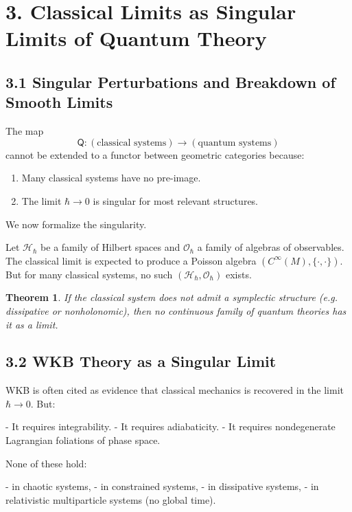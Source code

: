 \documentclass[12pt,oneside]{book}
\theoremstyle{plain}
\newtheorem{theorem}{Theorem}[chapter]
\theoremstyle{definition}
\begin{document}
\bigskip

\section{3. Classical Limits as Singular Limits of Quantum Theory}

\subsection{3.1 Singular Perturbations and Breakdown of Smooth Limits}

The map  
\[
\mathsf{Q}: (\text{classical systems}) \to (\text{quantum systems})
\]
cannot be extended to a functor between geometric categories because:

\begin{enumerate}
\item Many classical systems have no pre-image.  
\item The limit $\hbar \to 0$ is singular for most relevant structures.
\end{enumerate}

We now formalize the singularity.

Let $\mathcal{H}_\hbar$ be a family of Hilbert spaces and $\mathcal{O}_\hbar$ a family of algebras of observables.  
The classical limit is expected to produce a Poisson algebra $(C^\infty(M),\{\cdot,\cdot\})$.  
But for many classical systems, no such $(\mathcal{H}_\hbar,\mathcal{O}_\hbar)$ exists.

\begin{theorem}
If the classical system does not admit a symplectic structure (e.g. dissipative or nonholonomic), then no continuous family of quantum theories has it as a limit.
\end{theorem}

\subsection{3.2 WKB Theory as a Singular Limit}

WKB is often cited as evidence that classical mechanics is recovered in the limit $\hbar\to0$.  
But:

- It requires integrability.
- It requires adiabaticity.
- It requires nondegenerate Lagrangian foliations of phase space.

None of these hold:

- in chaotic systems,
- in constrained systems,
- in dissipative systems,
- in relativistic multiparticle systems (no global time).
\end{document}
